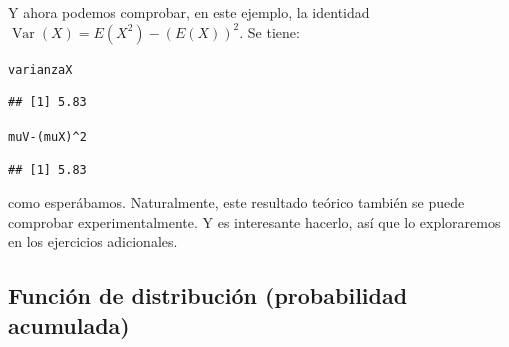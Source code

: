 \documentclass[10pt,a4paper]{article}\usepackage[]{graphicx}\usepackage[]{color}
\makeatletter
\newcommand{\hlnum}[1]{\textcolor[rgb]{0.686,0.059,0.569}{#1}}%
\newcommand{\hlopt}[1]{\textcolor[rgb]{0,0,0}{#1}}%
\newcommand{\hlstd}[1]{\textcolor[rgb]{0.345,0.345,0.345}{#1}}%
\newenvironment{kframe}{%
 \def\at@end@of@kframe{}%
 \ifinner\ifhmode%
  \def\at@end@of@kframe{\end{minipage}}%
  \begin{minipage}{\columnwidth}%
 \fi\fi%
 \def\FrameCommand##1{\hskip\@totalleftmargin \hskip-\fboxsep
 \colorbox{shadecolor}{##1}\hskip-\fboxsep
     \hskip-\linewidth \hskip-\@totalleftmargin \hskip\columnwidth}%
 \MakeFramed {\advance\hsize-\width
   \@totalleftmargin\z@ \linewidth\hsize
   \@setminipage}}%
 {\par\unskip\endMakeFramed%
 \at@end@of@kframe}
\newenvironment{knitrout}{}{} %
\makeatother
\begin{document}
Y ahora podemos comprobar, en este ejemplo, la identidad $\operatorname{Var}(X) = E(X^2) - \left(E(X)\right)^2$. Se tiene:
\begin{knitrout}
\color{fgcolor}\begin{kframe}
\begin{alltt}
\hlstd{varianzaX}
\end{alltt}
\begin{verbatim}
## [1] 5.83
\end{verbatim}
\begin{alltt}
\hlstd{muV} \hlopt{-} \hlstd{(muX)}\hlopt{^}\hlnum{2}
\end{alltt}
\begin{verbatim}
## [1] 5.83
\end{verbatim}
\end{kframe}
\end{knitrout}
como esperábamos. Naturalmente, este resultado teórico también se puede comprobar experimentalmente. Y es interesante hacerlo, así que lo exploraremos en los ejercicios adicionales.


\subsection{Función de distribución (probabilidad acumulada)}
\label{tut04:subsec:FuncionDistribucion}
\end{document}
